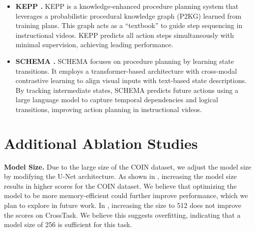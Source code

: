 \begin{itemize}
    \item \textbf{KEPP \citep{nagasinghe2024not}.} KEPP is a knowledge-enhanced procedure planning system that leverages a probabilistic procedural knowledge graph (P2KG) learned from training plans. This graph acts as a ``textbook'' to guide step sequencing in instructional videos. KEPP predicts all action steps simultaneously with minimal supervision, achieving leading performance.
    \item \textbf{SCHEMA \citep{niu2024schema}.} SCHEMA focuses on procedure planning by learning state transitions. It employs a transformer-based architecture with cross-modal contrastive learning to align visual inputs with text-based state descriptions. By tracking intermediate states, SCHEMA predicts future actions using a large language model to capture temporal dependencies and logical transitions, improving action planning in instructional videos.
\end{itemize}


\section{Additional Ablation Studies}


\textbf{Model Size.} Due to the large size of the COIN dataset, we adjust the model size by modifying the U-Net architecture. As shown in , increasing the model size results in higher scores for the COIN dataset. We believe that optimizing the model to be more memory-efficient could further improve performance, which we plan to explore in future work. In , increasing the size to 512 does not improve the scores on CrossTask. We believe this suggests overfitting, indicating that a model size of 256 is sufficient for this task.

